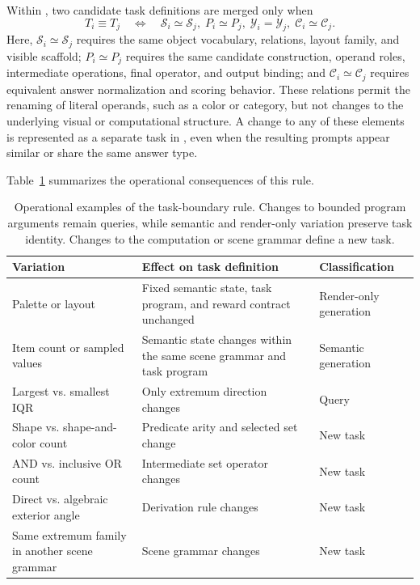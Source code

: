 Within \trace, two candidate task definitions are merged only when
\begin{equation}
  T_i \equiv T_j
  \quad\Longleftrightarrow\quad
  \mathcal{S}_i \simeq \mathcal{S}_j,\;
  P_i \simeq P_j,\;
  \mathcal{Y}_i = \mathcal{Y}_j,\;
  \mathcal{C}_i \simeq \mathcal{C}_j.
  \label{eq:task-equivalence}
\end{equation}
Here, $\mathcal{S}_i \simeq \mathcal{S}_j$ requires the same object
vocabulary, relations, layout family, and visible scaffold;
$P_i \simeq P_j$ requires the same candidate construction, operand roles,
intermediate operations, final operator, and output binding; and
$\mathcal{C}_i \simeq \mathcal{C}_j$ requires equivalent answer
normalization and scoring behavior. These relations permit the renaming of
literal operands, such as a color or category, but not changes to the
underlying visual or computational structure. A change to any of these
elements is represented as a separate task in \trace, even when the resulting
prompts appear similar or share the same answer type.

Table~\ref{tab:task-boundaries} summarizes the operational consequences of
this rule.

\begin{table}[t]
  \centering
  \small
  \caption{Operational examples of the \trace task-boundary rule. Changes to
  bounded program arguments remain queries, while semantic and render-only
  variation preserve task identity. Changes to the computation or scene
  grammar define a new task.}
  \label{tab:task-boundaries}
  \begin{tabular}{@{}p{}p{}p{}@{}}
    \toprule
    Variation & Effect on task definition & Classification \\
    \midrule
    Palette or layout
      & Fixed semantic state, task program, and reward contract unchanged
      & Render-only generation \\
    Item count or sampled values
      & Semantic state changes within the same scene grammar and task program
      & Semantic generation \\
    Largest vs. smallest IQR
      & Only extremum direction changes
      & Query \\
    Shape vs. shape-and-color count
      & Predicate arity and selected set change
      & New task \\
    AND vs. inclusive OR count
      & Intermediate set operator changes
      & New task \\
    Direct vs. algebraic exterior angle
      & Derivation rule changes
      & New task \\
    Same extremum family in another scene grammar
      & Scene grammar changes
      & New task \\
    \bottomrule
  \end{tabular}
\end{table}

